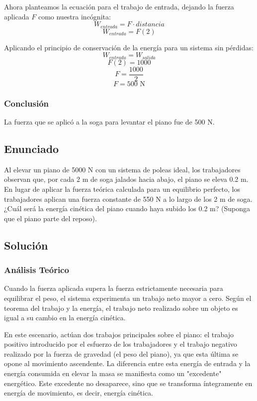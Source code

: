 \documentclass[a4paper,12pt]{article}
\begin{document}
Ahora planteamos la ecuación para el trabajo de entrada, dejando la fuerza aplicada $F$ como nuestra incógnita:
$$W_{entrada}=F\cdot distancia$$
$$W_{entrada}=F(2)$$

Aplicando el principio de conservación de la energía para un sistema sin pérdidas:
$$W_{entrada}=W_{salida}$$
$$F(2)=1000$$
$$F=\frac{1000}{2}$$
$$F=500\text{ N}$$

\subsubsection*{Conclusión}
La fuerza que se aplicó a la soga para levantar el piano fue de 500 N.


\subsection*{Enunciado}
Al elevar un piano de 5000 N con un sistema de poleas ideal, los trabajadores observan que, por cada 2 m de soga jalados hacia abajo, el piano se eleva 0.2 m. En lugar de aplicar la fuerza teórica calculada para un equilibrio perfecto, los trabajadores aplican una fuerza constante de 550 N a lo largo de los 2 m de soga. ¿Cuál será la energía cinética del piano cuando haya subido los 0.2 m? (Suponga que el piano parte del reposo).

\subsection*{Solución}
\subsubsection*{Análisis Teórico}
Cuando la fuerza aplicada supera la fuerza estrictamente necesaria para equilibrar el peso, el sistema experimenta un trabajo neto mayor a cero. Según el teorema del trabajo y la energía, el trabajo neto realizado sobre un objeto es igual a su cambio en la energía cinética. 

En este escenario, actúan dos trabajos principales sobre el piano: el trabajo positivo introducido por el esfuerzo de los trabajadores y el trabajo negativo realizado por la fuerza de gravedad (el peso del piano), ya que esta última se opone al movimiento ascendente. La diferencia entre esta energía de entrada y la energía consumida en elevar la masa se manifiesta como un "excedente" energético. Este excedente no desaparece, sino que se transforma íntegramente en energía de movimiento, es decir, energía cinética.
\end{document}
